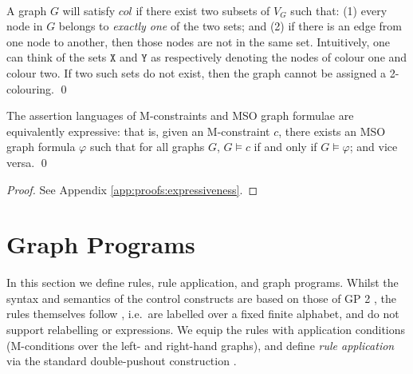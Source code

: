 \documentclass{llncs}
\begin{document}
\begin{example}
\begin{tabular}{rll}
		\end{tabular}\\
				
		\noindent A graph $G$ will satisfy $col$ if there exist two subsets of $V_G$ such that: (1) every node in $G$ belongs to \emph{exactly one} of the two sets; and (2) if there is an edge from one node to another, then those nodes are not in the same set. Intuitively, one can think of the sets $\mathtt{X}$ and $\mathtt{Y}$ as respectively denoting the nodes of colour one and colour two. If two such sets do not exist, then the graph cannot be assigned a 2-colouring.
		\qed
	\end{example}
	
	\begin{theorem}\label{thm:formulae_equiv}\rm
		The assertion languages of M-constraints and MSO graph formulae are equivalently expressive: that is, given an M-constraint $c$, there exists an MSO graph formula $\varphi$ such that for all graphs $G$, $G\models c$ if and only if $G \models \varphi$; and vice versa.
		\qed
	\end{theorem}
	
	\begin{proof}
		See Appendix \ref{app:proofs:expressiveness}.
	\end{proof}
	

	
	
		\section{Graph Programs}\label{sec:graph_programs}

		In this section we define rules, rule application, and graph programs. Whilst the syntax and semantics of the control constructs are based on those of GP 2 \cite{Plump12a}, the rules themselves follow \cite{Habel-Pennemann-Rensink06a,Pennemann09a}, i.e.\ are labelled over a fixed finite alphabet, and do not support relabelling or expressions. We equip the rules with application conditions (M-conditions over the left- and right-hand graphs), and define \emph{rule application} via the standard double-pushout construction \cite{Ehrig-Ehrig-Prange-Taentzer06a}.
		
\end{document}
